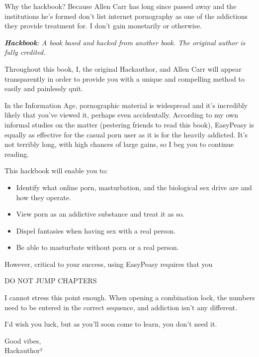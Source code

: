 \documentclass[easypeasy.tex]{subfiles}
\begin{document}
Why the hackbook? Because Allen Carr has long since passed away and the institutions he's formed don't list internet pornography as one of the addictions they provide treatment for. I don't gain monetarily or otherwise.

\textit{{\small \textbf{Hackbook}: A book based and hacked from another book. The original author is fully credited.}}

Throughout this book, I, the original Hackauthor, and Allen Carr will appear transparently in order to provide you with a unique and compelling method to easily and painlessly quit.

In the Information Age, pornographic material is widespread and it's incredibly likely that you've viewed it, perhaps even accidentally. According to my own informal studies on the matter (pestering friends to read this book), EasyPeasy is equally as effective for the casual porn user as it is for the heavily addicted. It's not terribly long, with high chances of large gains, so I beg you to continue reading.

This hackbook will enable you to:
\begin{itemize}
  \item Identify what online porn, masturbation, and the biological sex drive are and how they operate.
  \item View porn as an addictive substance and treat it as so.
  \item Dispel fantasies when having sex with a real person.
  \item Be able to masturbate without porn or a real person.
\end{itemize}

However, critical to your success, using EasyPeasy requires that you

{\huge DO NOT JUMP CHAPTERS}

I cannot stress this point enough. When opening a combination lock, the numbers need to be entered in the correct sequence, and addiction isn't any different.

I'd wish you luck, but as you'll soon come to learn, you don't need it.

Good vibes, \\
Hackauthor²
\end{document}
